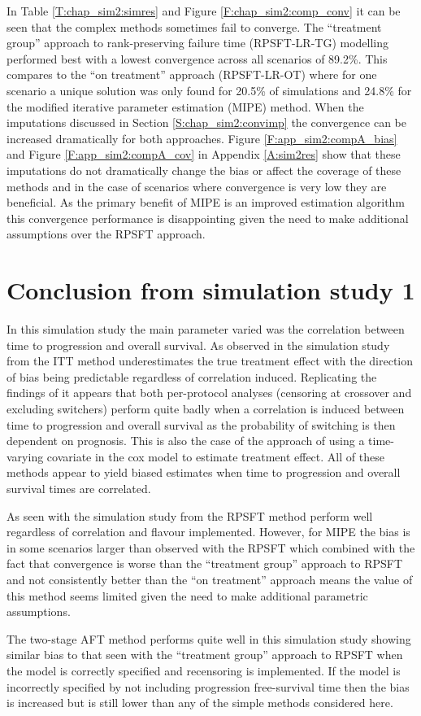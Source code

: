 In Table \ref{T:chap_sim2:simres} and Figure \ref{F:chap_sim2:comp_conv} it can be seen that the complex methods sometimes fail to converge. The ``treatment group'' approach to rank-preserving failure time (RPSFT-LR-TG) modelling performed best with a lowest convergence across all scenarios of 89.2\%. This compares to the  ``on treatment'' approach (RPSFT-LR-OT) where for one scenario a unique solution was only found for 20.5\% of simulations and 24.8\% for the modified iterative parameter estimation (MIPE) method. When the imputations discussed in Section \ref{S:chap_sim2:convimp} the convergence can be increased dramatically for both approaches. Figure \ref{F:app_sim2:compA_bias} and Figure \ref{F:app_sim2:compA_cov} in Appendix \ref{A:sim2res} show that these imputations do not dramatically change the bias or affect the coverage of these methods and in the case of scenarios where convergence is very low they are beneficial. As the primary benefit of MIPE is an improved estimation algorithm this convergence performance is disappointing given the need to make additional assumptions over the RPSFT approach.


\clearpage

\section{Conclusion from simulation study 1}

In this simulation study the main parameter varied was the correlation between time to progression and overall survival. As observed in the simulation study from \cite{Morden2011} the ITT method underestimates the true treatment effect with the direction of bias being predictable regardless of correlation induced. Replicating the findings of \cite{Morden2011} it appears that both per-protocol analyses (censoring at crossover and excluding switchers) perform quite badly when a correlation is induced between time to progression and overall survival as the probability of switching is then dependent on prognosis. This is also the case of the approach of using a time-varying covariate in the cox model to estimate treatment effect. All of these methods appear to yield biased estimates when time to progression and overall survival times are correlated. 

As seen with the simulation study from \cite{Morden2011} the RPSFT method perform well regardless of correlation and flavour implemented. However, for MIPE the bias is in some scenarios larger than observed with the RPSFT which combined with the fact that convergence is worse than the ``treatment group'' approach to RPSFT and not consistently better than the ``on treatment'' approach means the value of this method seems limited given the need to make additional parametric assumptions.

The two-stage AFT method performs quite well in this simulation study showing similar bias to that seen with the ``treatment group'' approach to RPSFT when the model is correctly specified and recensoring is implemented. If the model is incorrectly specified by not including progression free-survival time then the bias is increased but is still lower than any of the simple methods considered here.

